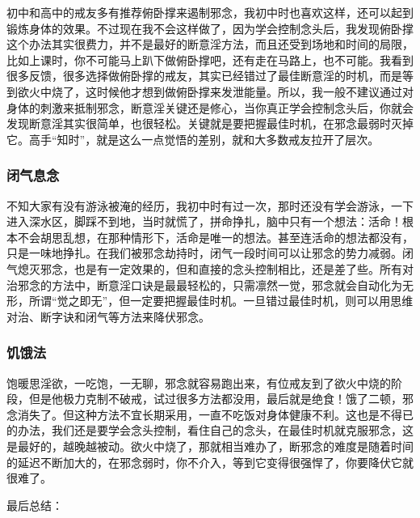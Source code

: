 初中和高中的戒友多有推荐俯卧撑来遏制邪念，我初中时也喜欢这样，还可以起到锻炼身体的效果。不过现在我不会这样做了，因为学会控制念头后，我发现俯卧撑这个办法其实很费力，并不是最好的断意淫方法，而且还受到场地和时间的局限，比如上课时，你不可能马上趴下做俯卧撑吧，还有走在马路上，也不可能。我看到很多反馈，很多选择做俯卧撑的戒友，其实已经错过了最佳断意淫的时机，而是等到欲火中烧了，这时候他才想到做俯卧撑来发泄能量。所以，我一般不建议通过对身体的刺激来抵制邪念，断意淫关键还是修心，当你真正学会控制念头后，你就会发现断意淫其实很简单，也很轻松。关键就是要把握最佳时机，在邪念最弱时灭掉它。高手“知时”，就是这么一点觉悟的差别，就和大多数戒友拉开了层次。

\subsubsection{闭气息念}

不知大家有没有游泳被淹的经历，我初中时有过一次，那时还没有学会游泳，一下进入深水区，脚踩不到地，当时就慌了，拼命挣扎，脑中只有一个想法：活命！根本不会胡思乱想，在那种情形下，活命是唯一的想法。甚至连活命的想法都没有，只是一味地挣扎。在我们被邪念劫持时，闭气一段时间可以让邪念的势力减弱。闭气熄灭邪念，也是有一定效果的，但和直接的念头控制相比，还是差了些。所有对治邪念的方法中，断意淫口诀是最最轻松的，只需凛然一觉，邪念就会自动化为无形，所谓“觉之即无”，但一定要把握最佳时机。一旦错过最佳时机，则可以用思维对治、断字诀和闭气等方法来降伏邪念。

\subsubsection{饥饿法}

饱暖思淫欲，一吃饱，一无聊，邪念就容易跑出来，有位戒友到了欲火中烧的阶段，但是他极力克制不破戒，试过很多方法都没用，最后就是绝食！饿了二顿，邪念消失了。但这种方法不宜长期采用，一直不吃饭对身体健康不利。这也是不得已的办法，我们还是要学会念头控制，看住自己的念头，在最佳时机就克服邪念，这是最好的，越晚越被动。欲火中烧了，那就相当难办了，断邪念的难度是随着时间的延迟不断加大的，在邪念弱时，你不介入，等到它变得很强悍了，你要降伏它就很难了。


最后总结：


